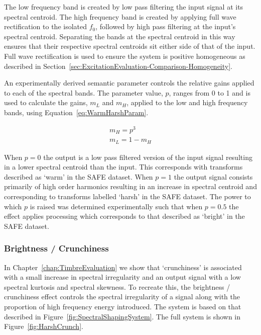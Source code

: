 			The low frequency band is created by low pass filtering the input signal at its spectral centroid.
			The high frequency band is created by applying full wave rectification to the isolated $f_{0}$,
			followed by high pass filtering at the input's spectral centroid.  Separating the bands at the
			spectral centroid in this way ensures that their respective spectral centroids sit either side of
			that of the input. Full wave rectification is used to ensure the system is positive homogeneous as
			described in Section~\ref{sec:ExcitationEvaluation-Comparison-Homogeneity}.

			An experimentally derived semantic parameter controls the relative gains applied to each of the
			spectral bands. The parameter value, $p$, ranges from 0 to 1 and is used to calculate the gains,
			$m_{L}$ and $m_{H}$, applied to the low and high frequency bands, using
			Equation~\ref{eq:WarmHarshParam}.

			\begin{gather}
				m_{H} = p^{3} \nonumber \\
				m_{L} = 1 - m_{H}
				\label{eq:WarmHarshParam}
			\end{gather}

			When $p = 0$  the output is a low pass filtered version of the input signal resulting in a lower
			spectral centroid than the input. This corresponds with transforms described as `warm' in the SAFE
			dataset. When $p = 1$ the output signal consists primarily of high order harmonics resulting in an
			increase in spectral centroid and corresponding to transforms labelled `harsh' in the SAFE dataset.
			The power to which $p$ is raised was determined experimentally such that when $p = 0.5$ the effect
			applies processing which corresponds to that described as `bright' in the SAFE dataset. 

		\subsubsection*{Brightness / Crunchiness}
			In Chapter~\ref{chap:TimbreEvaluation} we show that `crunchiness' is associated with a small
			increase in spectral irregularity and an output signal with a low spectral kurtosis and spectral
			skewness. To recreate this, the brightness / crunchiness effect controls the spectral irregularity
			of a signal along with the proportion of high frequency energy introduced.  The system is based on
			that described in Figure~\ref{fig:SpectralShapingSystem}. The full system is shown in
			Figure~\ref{fig:HarshCrunch}.

